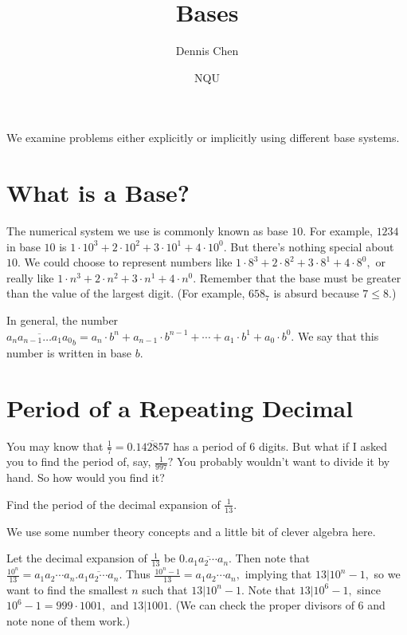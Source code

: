 \documentclass{article}
\title{Bases}
\author{Dennis Chen}
\date{NQU}
\begin{document}
\maketitle

We examine problems either explicitly or implicitly using different base systems.

\section{What is a Base?}
The numerical system we use is commonly known as base $10.$ For example, $1234$ in base $10$ is $1\cdot 10^3+2\cdot 10^2+3\cdot 10^1+4\cdot 10^0.$ But there's nothing special about $10.$ We could choose to represent numbers like $1\cdot 8^3+2\cdot 8^2+3\cdot 8^1+4\cdot 8^0,$ or really like $1\cdot n^3+2\cdot n^2+3\cdot n^1+4\cdot n^0.$ Remember that the base must be greater than the value of the largest digit. (For example, $658_7$ is absurd because $7\leq 8.$)

\begin{defi}[Base $b$]
In general, the number $\overline{a_na_{n-1}\ldots a_{1}a_{0}}_b=a_n\cdot b^n+a_{n-1}\cdot b^{n-1}+\cdots+a_1\cdot b^1+a_0\cdot b^0.$ We say that this number is written in base $b.$
\end{defi}

\section{Period of a Repeating Decimal}
You may know that $\frac{1}{7}=0.\overline{142857}$ has a period of $6$ digits. But what if I asked you to find the period of, say, $\frac{1}{997}?$ You probably wouldn't want to divide it by hand. So how would you find it?

\begin{exam}
Find the period of the decimal expansion of $\frac{1}{13}.$
\end{exam}

\begin{sol}
We use some number theory concepts and a little bit of clever algebra here.

Let the decimal expansion of $\frac{1}{13}$ be $0.\overline{a_1a_2\cdots a_n}.$ Then note that $\frac{10^n}{13}=a_1a_2\cdots a_n.\overline{a_1a_2\cdots a_n}.$ Thus $\frac{10^n-1}{13}=a_1a_2\cdots a_n,$ implying that $13|10^n-1,$ so we want to find the smallest $n$ such that $13|10^n-1.$ Note that $13|10^6-1,$ since $10^6-1=999\cdot 1001,$ and $13|1001.$ (We can check the proper divisors of $6$ and note none of them work.)
\end{sol}
\end{document}
